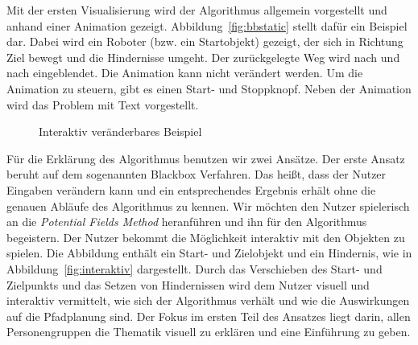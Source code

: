 Mit der ersten Visualisierung wird der Algorithmus allgemein vorgestellt und anhand einer Animation gezeigt. %
Abbildung~\vref{fig:bbstatic} stellt dafür ein Beispiel dar.  Dabei wird ein Roboter (bzw. ein Startobjekt) gezeigt, der sich in Richtung Ziel bewegt und die Hindernisse umgeht. Der zurückgelegte Weg wird nach und nach eingeblendet. Die Animation kann nicht verändert werden. Um die Animation zu steuern, gibt es einen Start- und Stoppknopf. Neben der Animation wird das Problem mit Text vorgestellt. %
\begin{figure}[ht!]
  \centering
  \caption{Interaktiv veränderbares Beispiel}
  \label{fig:interaktiv}
\end{figure}


Für die Erklärung des Algorithmus benutzen wir zwei Ansätze. Der erste Ansatz beruht auf dem sogenannten Blackbox Verfahren. Das heißt, dass der Nutzer  Eingaben verändern kann und  ein entsprechendes Ergebnis erhält ohne die genauen Abläufe des Algorithmus zu kennen. Wir möchten den Nutzer spielerisch an die \textit{Potential Fields Method} heranführen und ihn für den Algorithmus begeistern. Der Nutzer bekommt die Möglichkeit interaktiv mit den Objekten zu spielen. Die Abbildung enthält ein Start- und Zielobjekt und ein Hindernis, wie in Abbildung~\vref{fig:interaktiv} dargestellt. Durch das Verschieben des Start- und Zielpunkts und das Setzen von Hindernissen wird dem Nutzer visuell und interaktiv vermittelt, wie sich der Algorithmus verhält und wie die Auswirkungen auf die Pfadplanung sind. Der Fokus im ersten Teil des Ansatzes liegt darin, allen Personengruppen die Thematik visuell zu erklären und eine Einführung zu geben.


